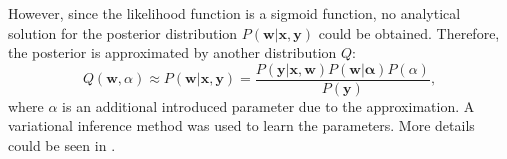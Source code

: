 




However, since the likelihood function is a sigmoid function, no analytical solution for the posterior distribution $P(\mathbf{w}|\mathbf{x}, \mathbf{y})$ could be obtained. Therefore, the posterior is approximated by another distribution $Q$:
\begin{equation}
    \label{eq:posterior}
    Q(\mathbf{w}, \alpha) \approx P(\mathbf{w}|\mathbf{x}, \mathbf{y}) = \frac{P(\mathbf{y}|\mathbf{x}, \mathbf{w})P(\mathbf{w|\alpha})P(\alpha)}{P(\mathbf{y})},
\end{equation}
where $\alpha$ is an additional introduced parameter due to the approximation. A variational inference method was used to learn the parameters. More details could be seen in \cite{senanayake2017bayesian}.


